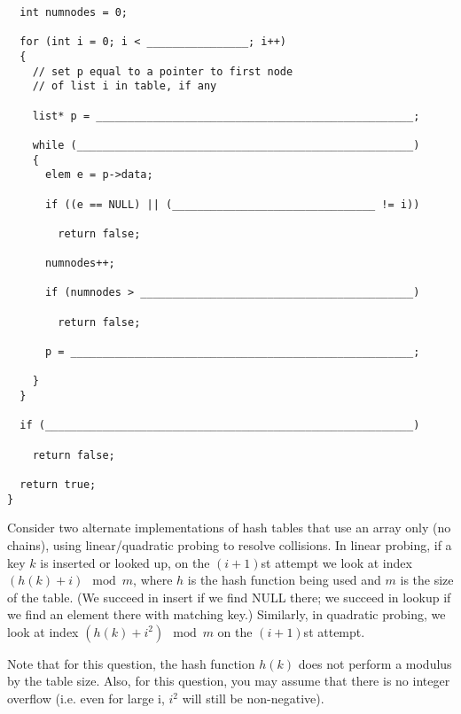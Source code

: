 \documentclass[12pt]{exam}
\begin{document}
\begin{questions}
\begin{parts}
\begin{solution}
\begin{verbatim}
  int numnodes = 0;

  for (int i = 0; i < ________________; i++)
  {
    // set p equal to a pointer to first node 
    // of list i in table, if any

    list* p = __________________________________________________;    

    while (_____________________________________________________)
    {
      elem e = p->data;
 
      if ((e == NULL) || (________________________________ != i)) 

        return false;

      numnodes++;

      if (numnodes > ___________________________________________) 

        return false;

      p = ______________________________________________________;

    }
  }

  if (__________________________________________________________) 

    return false;

  return true;
}
\end{verbatim}
\end{solution}
\end{parts}


\newpage
{}

Consider two alternate implementations of hash tables that use an
array only (no chains), using linear/quadratic probing to resolve
collisions. In linear probing, if a key $k$ is inserted or looked up, on
the $(i+1)$st attempt we look at index $(h(k) + i) \mod m$, where $h$
is the hash function being used and $m$ is the size of the table. (We
succeed in insert if we find NULL there; we succeed in lookup if we
find an element there with matching key.)
Similarly, in quadratic probing, we look at index $(h(k) + i^2) \mod
m$ on the $(i+1)$st attempt.

Note that for this question, the hash function $h(k)$ does not perform
a modulus by the table size.  Also, for this question, you may assume
that there is no integer overflow (i.e. even for large i, $i^2$ will
still be non-negative).

\end{questions}
\end{document}

